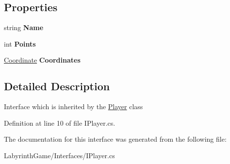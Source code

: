 \subsection*{Properties}
\begin{DoxyCompactItemize}
\item 
\hypertarget{interface_labyrinth_game_1_1_interfaces_1_1_i_player_ada91c3312fd708c5c66da510529a5602}{string {\bfseries Name}}\label{interface_labyrinth_game_1_1_interfaces_1_1_i_player_ada91c3312fd708c5c66da510529a5602}

\item 
\hypertarget{interface_labyrinth_game_1_1_interfaces_1_1_i_player_aaa644f1f84177bdf8760bef94f9c8467}{int {\bfseries Points}}\label{interface_labyrinth_game_1_1_interfaces_1_1_i_player_aaa644f1f84177bdf8760bef94f9c8467}

\item 
\hypertarget{interface_labyrinth_game_1_1_interfaces_1_1_i_player_a78df99d940e4e8cb40215ebcc2319809}{\hyperlink{class_labyrinth_game_1_1_coordinate}{Coordinate} {\bfseries Coordinates}}\label{interface_labyrinth_game_1_1_interfaces_1_1_i_player_a78df99d940e4e8cb40215ebcc2319809}

\end{DoxyCompactItemize}


\subsection{Detailed Description}
Interface which is inherited by the \hyperlink{class_labyrinth_game_1_1_player}{Player} class 



Definition at line 10 of file I\+Player.\+cs.



The documentation for this interface was generated from the following file\+:\begin{DoxyCompactItemize}
\item 
Labyrinth\+Game/\+Interfaces/I\+Player.\+cs\end{DoxyCompactItemize}
